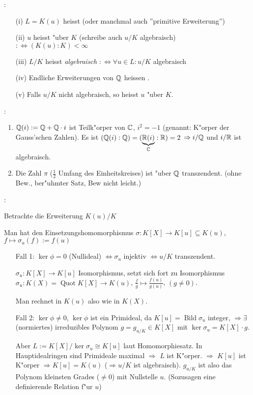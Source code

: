 :{\begin{enumerate}
 \item[(i)] $L=K(u)$ heisst \emph{} (oder manchmal auch ''primitive Erweiterung'')
 \item[(ii)] $u$ heisst \emph{} "uber $K$ (schreibe auch $u/K$ algebraisch)\\
 $:\iff (K(u):K)<\infty$
 \item[(iii)] $L/K$ heisst \emph{algebraisch} $:\iff \forall u\in L: u/K$ algebraisch
 \item[(iv)] Endliche Erweiterungen von $\mathbb Q$ heissen 
   \emph{}.
 \item[(v)] Falls $u/K$ nicht algebraisch, so heisst $u$ 
   \emph{} "uber $K$.
 \end{enumerate}
 }
\example{}:{\begin{enumerate}
 \item $\mathbb Q(i):=\mathbb Q + \mathbb Q\cdot i$ ist Teilk"orper von $\mathbb C$, $i^2=-1$
 (genannt: K"orper der Gauss'schen Zahlen). Es ist $(\mathbb Q(i):\mathbb Q)=(\underbrace{\mathbb R(i)}_{\mathbb C}:\mathbb R)=2$
 $\Rightarrow i/\mathbb Q$ und $i/\mathbb R$ ist algebraisch.
 \item Die Zahl $\pi$ ($\frac{1}{2}$ Umfang des Einheitskreises) ist "uber $\mathbb Q$ transzendent.
 (ohne Bew., ber"uhmter Satz, Bew nicht leicht.)
 \end{enumerate}
 }  
\remark{}:{Betrachte die Erweiterung $K(u)/K$

 Man hat den Einsetzungshomomorphismus $\sigma:K[X]\longrightarrow K[u]\subseteq K(u)$,
 $f \mapsto \sigma_u(f):=f(u)$

 \begin{enumerate}
 \item[Fall 1:] $\ker \phi=0$ (Nullideal) $\iff \sigma_u$ injektiv $\iff u/K$ transzendent.
 
 $\sigma_u: K[X]\longrightarrow K[u]$ Isomorphismus, setzt sich fort zu Isomorphismus
 $\sigma_u:K(X)=\operatorname{Quot}K[X]\longrightarrow K(u)$, 
 $\frac{f}{g}\mapsto \frac{f(u)}{g(u)}$, $(g\neq 0)$.
 
 Man rechnet in $K(u)$ also wie in $K(X)$.
 \item[Fall 2:] $\ker \phi \neq 0$, $\ker \phi$ ist ein Primideal, da $K[u]=\operatorname{Bild}\sigma_u$
 integer, $\Rightarrow \exists$ (normiertes) irreduzibles Polynom $g=g_{u/K}\in K[X]$ 
 mit $\ker \sigma_u=K[X]\cdot g$.
 
 Aber $L:=K[X]/ \ker \sigma_u \cong K[u]$ laut Homomorphiesatz. In Hauptidealringen sind 
 Primideale maximal $\Rightarrow$ $L$ ist K"orper. $\Rightarrow$ $K[u]$ ist K"orper $\Rightarrow K[u]=K(u)$
 ($\Rightarrow u/K$ ist algebraisch).
 $g_{u/K}$ ist also das Polynom kleinsten Grades ($\neq 0$) mit Nullstelle $u$.
 (Sozusagen eine definierende Relation f"ur $u$)  
 \end{enumerate}
}  
